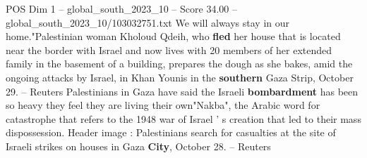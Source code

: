 \begin{textsample}{POS Dim 1 – global\_south\_2023\_10 – Score 34.00 – global\_south\_2023\_10/103032751.txt}
We will always stay in our home."Palestinian woman Kholoud Qdeih, who \textbf{fled} her house that is located near the border with Israel and now lives with 20 members of her extended family in the basement of a building, prepares the dough as she bakes, amid the ongoing attacks by Israel, in Khan Younis in the \textbf{southern} Gaza Strip, October 29. -- Reuters Palestinians in Gaza have said the Israeli \textbf{bombardment} has been so heavy they feel they are living their own"Nakba", the Arabic word for catastrophe that refers to the 1948 war of Israel ' s creation that led to their mass dispossession.
Header image : Palestinians search for casualties at the site of Israeli strikes on houses in Gaza \textbf{City}, October 28. -- Reuters

\end{textsample}
